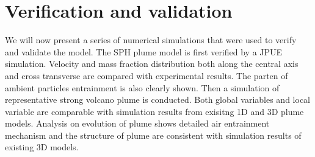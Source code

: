 \documentclass[10pt,a4paper]{article}
\begin{document}
\section{Verification and validation} \label{sec:verification-validation}
We will now present a series of numerical simulations that were used to verify and validate the model. The SPH plume model is first verified by a JPUE simulation. Velocity and mass fraction distribution both along the central axis and cross transverse are compared with experimental results. The parten of  ambient particles entrainment is also clearly shown. Then a simulation of representative strong volcano plume is conducted. Both global variables and local variable are comparable with simulation results from exisitng 1D and 3D plume models. Analysis on evolution of plume shows detailed air entrainment mechanism and the structure of plume are consistent with simulation results of existing 3D models. 
\end{document}
